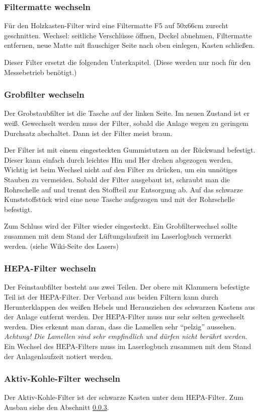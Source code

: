 \documentclass{\basedir/fablab-document}
\begin{document}
	\subsubsection{Filtermatte wechseln}
	Für den Holzkasten-Filter wird eine Filtermatte F5 auf 50x66cm zurecht geschnitten.
	Wechsel: seitliche Verschlüsse öffnen, Deckel abnehmen, Filtermatte entfernen, neue Matte mit flauschiger Seite nach oben einlegen, Kasten schließen.

	Dieser Filter ersetzt die folgenden Unterkapitel. (Diese werden nur noch für den Messebetrieb benötigt.)
	\subsubsection{Grobfilter wechseln}
	Der Grobstaubfilter ist die Tasche auf der linken Seite. Im neuen Zustand ist er weiß. Gewechselt werden muss der Filter, sobald die Anlage wegen zu geringem Durchsatz abschaltet. Dann ist der Filter meist braun.

	Der Filter ist mit einem eingesteckten Gummistutzen an der Rückwand befestigt. Dieser kann einfach durch leichtes Hin und Her drehen abgezogen werden. Wichtig ist beim Wechsel nicht auf den Filter zu drücken, um ein unnötiges Stauben zu vermeiden. Sobald der Filter ausgebaut ist, schraubt man die Rohrschelle auf und trennt den Stoffteil zur Entsorgung ab. Auf das schwarze Kunststoffstück wird eine neue Tasche aufgezogen und mit der Rohrschelle befestigt.

	Zum Schluss wird der Filter wieder eingesteckt. Ein Grobfilterwechsel sollte zusammen mit dem Stand der Lüftungslaufzeit im Laserlogbuch vermerkt werden. (siehe Wiki-Seite des Lasers)
	\subsubsection{HEPA-Filter wechseln}
	\label{subsubsec:HEPA-Filter}
	Der Feinstaubfilter besteht aus zwei Teilen. Der obere mit Klammern befestigte Teil ist der HEPA-Filter. Der Verband aus beiden Filtern kann durch Herunterklappen des weißen Hebels und Herausziehen des schwarzen Kastens aus der Anlage entfernt werden.
	Der HEPA-Filter muss nur sehr selten gewechselt werden. Dies erkennt man daran, dass die Lamellen sehr \enquote{pelzig} aussehen. \emph{Achtung! Die Lamellen sind sehr empfindlich und dürfen nicht berührt werden.}
	Ein Wechsel des HEPA-Filters muss im Laserlogbuch zusammen mit dem Stand der Anlagenlaufzeit notiert werden.
	\subsubsection{Aktiv-Kohle-Filter wechseln}
	Der Aktiv-Kohle-Filter ist der schwarze Kasten unter dem HEPA-Filter. Zum Ausbau siehe den Abschnitt \ref{subsubsec:HEPA-Filter}.
\end{document}
